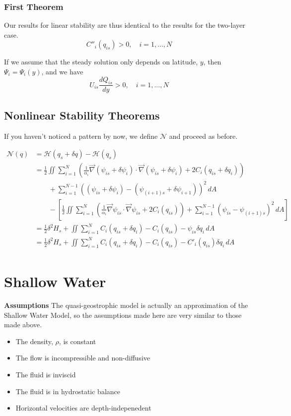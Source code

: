 \documentclass[12pt]{article}
\begin{document}
    \subsubsection{First Theorem}
    Our results for linear stability are thus identical to the results for the two-layer case.
    $$
    C''_i(q_{is}) > 0, \quad i=1,...,N
    $$

    If we assume that the steady solution only depends on latitude, $y$, then $\Psi_i = \Psi_i(y)$, and we have
    $$
    U_{is} \frac{d Q_{is}}{dy} > 0, \quad i=1,...,N
    $$

  \subsection{Nonlinear Stability Theorems}
    If you haven't noticed a pattern by now, we define $\mathcal{N}$ and proceed as before.

    \begin{align*}
      \mathcal{N}(q)
      & = \mathcal{H}(q_s + \delta q) - \mathcal{H}(q_s) \\
      &= \frac12 \iint \sum_{i=1}^N \left( \frac{1}{\alpha_i}\vec\nabla (\psi_{is} + \delta\psi_i) \cdot \vec\nabla (\psi_{is} + \delta\psi_i) + 2C_i(q_{is} + \delta q_i) \right) \\
      &\quad\quad + \sum_{i=1}^{N-1}((\psi_{is} + \delta\psi_i) - (\psi_{(i+1)s} + \delta\psi_{i+1}))^2 \, dA \\
      &\quad\quad - \left[ \frac12 \iint \sum_{i=1}^N \left( \frac{1}{\alpha_i}\vec\nabla \psi_{is} \cdot \vec\nabla \psi_{is} + 2C_i(q_{is}) \right) + \sum_{i=1}^{N-1}(\psi_{is} - \psi_{(i+1)s})^2 \, dA \right] \\
      &= \frac12 \delta^2 H_s + \iint \sum_{i=1}^N C_i(q_{is} + \delta q_i) - C_i(q_{is}) - \psi_{is}\delta q_i \, dA \\
      &= \frac12 \delta^2 H_s + \iint \sum_{i=1}^N C_i(q_{is} + \delta q_i) - C_i(q_{is}) - C'_i(q_{is})\delta q_i \, dA \\
    \end{align*}


\section{Shallow Water}

  \textbf{Assumptions}
  The quasi-geostrophic model is actually an approximation of the Shallow Water Model, so the assumptions made here are very similar to those made above.
  \begin{itemize}
    \item The density, $\rho$, is constant
    \item The flow is incompressible and non-diffusive
    \item The fluid is inviscid
    \item The fluid is in hydrostatic balance
    \item Horizontal velocities are depth-indepenedent
  \end{itemize}
\end{document}

